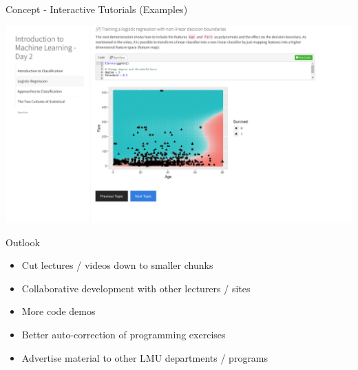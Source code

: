 \documentclass[10pt]{beamer}
\begin{document}
\begin{frame}{Concept - Interactive Tutorials (Examples)}

  \begin{center}
      \includegraphics[width=\textwidth]{figures/iml_tut1.png}
  \end{center}

\end{frame}

\begin{frame}{Outlook}
  \begin{itemize}
      \item Cut lectures / videos down to smaller chunks
      \item Collaborative development with other lecturers / sites
      \item More code demos
      \item Better auto-correction of programming exercises
      \item Advertise material to other LMU departments / programs
  \end{itemize}

\end{frame}
\end{document}
